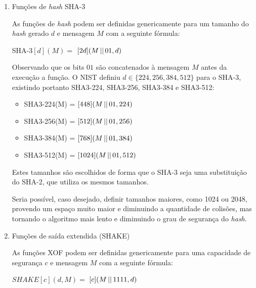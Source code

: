 \begin{enumerate}[label=\roman*.]
    \setlength\itemsep{1em}

    \item Funções de \textit{hash} SHA-3 \newline

        As funções de \textit{hash} podem ser definidas genericamente para um
        tamanho do \textit{hash} gerado $d$ e mensagem $M$ com a seguinte
        fórmula: \newline

        SHA-3$[d](M) =$ \Keccak$[2d](M \operatorname{\lvert\rvert} 01, d)$ \newline

        Observando que os bits $01$ são concatenados à mensagem $M$ antes da
        execução a função. O NIST definiu $d \in \{224, 256, 384, 512\}$ para
        o SHA-3, existindo portanto SHA3-224, SHA3-256, SHA3-384 e SHA3-512:

        \begin{itemize}
            \setlength\itemsep{0.2em}
            \item SHA3-224(M) = \Keccak$[448](M \operatorname{\lvert\rvert} 01, 224)$
            \item SHA3-256(M) = \Keccak$[512](M \operatorname{\lvert\rvert} 01, 256)$
            \item SHA3-384(M) = \Keccak$[768](M \operatorname{\lvert\rvert} 01, 384)$
            \item SHA3-512(M) = \Keccak$[1024](M \operatorname{\lvert\rvert} 01, 512)$
        \end{itemize}

        Estes tamanhos são escolhidos de forma que o SHA-3 seja uma
        substituição do SHA-2, que utiliza os mesmos tamanhos. \newline

        Seria possível, caso desejado, definir tamanhos maiores, como 1024 ou
        2048, provendo um espaço muito maior e diminuindo a quantidade de
        colisões, mas tornando o algoritmo mais lento e diminuindo o grau de
        segurança do \textit{hash}.

    \item Funções de saída extendida (SHAKE) \newline

        As funções XOF podem ser definidas genericamente para uma capacidade
        de segurança $c$ e mensagem $M$ com a seguinte fórmula: \newline

        $SHAKE[c](d, M) =$ \Keccak$[c](M \operatorname{\lvert\rvert} 1111, d)$ \newline


\end{enumerate}
